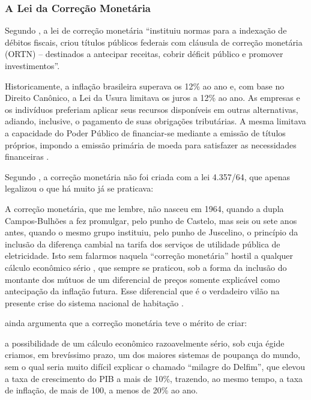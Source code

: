 \documentclass[
	10pt,				%
	openright,			%
	twoside,			%
	a5paper,			%
	english,			%
	french,				%
	spanish,			%
	brazil				%
	]{abntex2}
\renewenvironment{quote}
  {\small\list{}{\rightmargin=0.1cm \leftmargin=4cm}%
   \item\relax}
  {\endlist}
\begin{document}
\subsubsection{A Lei da Correção
Monetária}\label{a-lei-da-correuxe7uxe3o-monetuxe1ria}

Segundo , a lei de correção monetária
``instituiu normas para a indexação de débitos fiscais, criou títulos
públicos federais com cláusula de correção monetária (ORTN) --
destinados a antecipar receitas, cobrir déficit público e promover
investimentos''.

\begin{quote}
Historicamente, a inflação brasileira superava os 12\% ao ano e, com
base no Direito Canônico, a Lei da Usura limitava os juros a 12\% ao
ano. As empresas e os indivíduos preferiam aplicar seus recursos
disponíveis em outras alternativas, adiando, inclusive, o pagamento de
suas obrigações tributárias. A mesma limitava a capacidade do Poder
Público de financiar-se mediante a emissão de títulos próprios, impondo
a emissão primária de moeda para satisfazer as necessidades financeiras
\cite[p.~15]{fortuna2015}.
\end{quote}

Segundo , a correção monetária não foi
criada com a lei 4.357/64, que apenas legalizou o que há muito já se
praticava:

\begin{quote}
A correção monetária, que me lembre, não nasceu em 1964, quando a dupla
Campos-Bulhões a fez promulgar, pelo punho de Castelo, mas seis ou sete
anos antes, quando o mesmo grupo instituiu, pelo punho de Juscelino, o
princípio da inclusão da diferença cambial na tarifa dos serviços de
utilidade pública de eletricidade. Isto sem falarmos naquela ``correção
monetária'' hostil a qualquer cálculo econômico sério , que sempre se
praticou, sob a forma da inclusão do montante dos mútuos de um
diferencial de preços somente explicável como antecipação da inflação
futura. Esse diferencial que é o verdadeiro vilão na presente crise do
sistema nacional de habitação \cite[p.~411]{rangel1983}.
\end{quote}

 ainda argumenta que a correção monetária
teve o mérito de criar:

\begin{quote}
a possibilidade de um cálculo econômico razoavelmente sério, sob cuja
égide criamos, em brevíssimo prazo, um dos maiores sistemas de poupança
do mundo, sem o qual seria muito difícil explicar o chamado ``milagre do
Delfim'', que elevou a taxa de crescimento do PIB a mais de 10\%,
trazendo, ao mesmo tempo, a taxa de inflação, de mais de 100, a menos de
20\% ao ano.
\end{quote}
\end{document}
